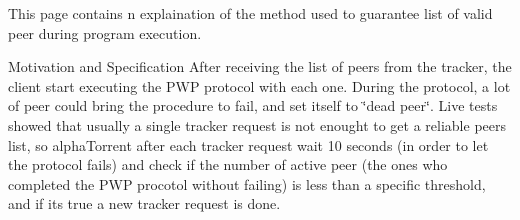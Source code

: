 This page contains n explaination of the method used to guarantee list of valid peer during program execution.

\begin{DoxyParagraph}{Motivation and Specification }
After receiving the list of peers from the tracker, the client start executing the P\+WP protocol with each one. During the protocol, a lot of peer could bring the procedure to fail, and set itself to \char`\"{}dead peer\char`\"{}. Live tests showed that usually a single tracker request is not enought to get a reliable peers list, so alpha\+Torrent after each tracker request wait 10 seconds (in order to let the protocol fails) and check if the number of active peer (the ones who completed the P\+WP procotol without failing) is less than a specific threshold, and if it\textquotesingle{}s true a new tracker request is done. 
\end{DoxyParagraph}
